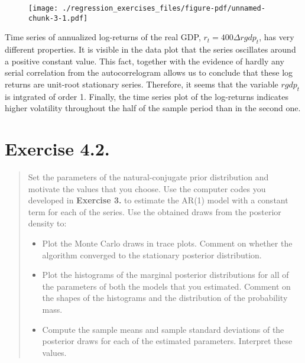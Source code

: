 \documentclass[
  letterpaper,
  DIV=11,
  numbers=noendperiod]{scrreprt}
\providecommand{\tightlist}{%
  \setlength{\itemsep}{0pt}\setlength{\parskip}{0pt}}\usepackage{longtable,booktabs,array}
\begin{document}
\begin{figure}[H]

{\centering \texttt{[image: ./regression\_exercises\_files/figure-pdf/unnamed-chunk-3-1.pdf]}

}

\end{figure}

Time series of annualized log-returns of the real GDP,
\(r_t = 400\Delta rgdp_t\), has very different properties. It is visible
in the data plot that the series oscillates around a positive constant
value. This fact, together with the evidence of hardly any serial
correlation from the autocorrelogram allows us to conclude that these
log returns are unit-root stationary series. Therefore, it seems that
the variable \(rgdp_t\) is intgrated of order 1. Finally, the time
series plot of the log-returns indicates higher volatility throughout
the half of the sample period than in the second one.

\hypertarget{exercise-4.2.}{%
\section*{Exercise 4.2.}\label{exercise-4.2.}}

\begin{quote}
Set the parameters of the natural-conjugate prior distribution and
motivate the values that you choose. Use the computer codes you
developed in \textbf{Exercise 3.} to estimate the AR(1) model with a
constant term for each of the series. Use the obtained draws from the
posterior density to:

\begin{itemize}
\tightlist
\item
  Plot the Monte Carlo draws in trace plots. Comment on whether the
  algorithm converged to the stationary posterior distribution.
\item
  Plot the histograms of the marginal posterior distributions for all of
  the parameters of both the models that you estimated. Comment on the
  shapes of the histograms and the distribution of the probability mass.
\item
  Compute the sample means and sample standard deviations of the
  posterior draws for each of the estimated parameters. Interpret these
  values.
\end{itemize}
\end{quote}
\end{document}
